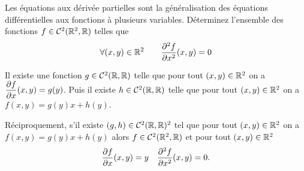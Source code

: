 Les équations aux dérivée partielles sont la généralisation des
équations différentielles aux fonctions à plusieurs variables. Déterminez
l'ensemble des fonctions \(f \in \mathcal{C}^{2}(\mathbb{R}^2, \mathbb{R})\) telles que
\begin{equation}
  \forall (x,y) \in \mathbb{R}^2 \qquad \dfrac{\partial{}^2 f}{\partial{} {x}^2}(x, y) = 0
\end{equation}

Il existe une fonction \(g \in \mathcal{C}^{2}(\mathbb{R}, \mathbb{R})\) telle que pour tout
\((x, y) \in \mathbb{R}^2\) on a \(\dfrac{\partial{} f}{\partial{} x}(x, y)=g(y)\). Puis il existe
\(h \in  \mathcal{C}^{2}(\mathbb{R}, \mathbb{R})\) telle que pour tout \((x, y) \in \mathbb{R}^2\) on
a \(f(x, y) = g(y)x+h(y)\).

Réciproquement, s'il existe \((g, h) \in \mathcal{C}^{2}(\mathbb{R}, \mathbb{R})^2\) tel que
pour tout \((x, y) \in \mathbb{R}^2\) on a \(f(x, y) = g(y)x+h(y)\) alors \(f
\in \mathcal{C}^{2}(\mathbb{R}^2, \mathbb{R})\) et pour tout \((x, y) \in \mathbb{R}^2\)
\begin{equation}
  \dfrac{\partial{} f}{\partial{} x}(x,y)=y \quad   \dfrac{\partial{}^2 f}{\partial{} {x}^2}(x,y)=0.
\end{equation}
